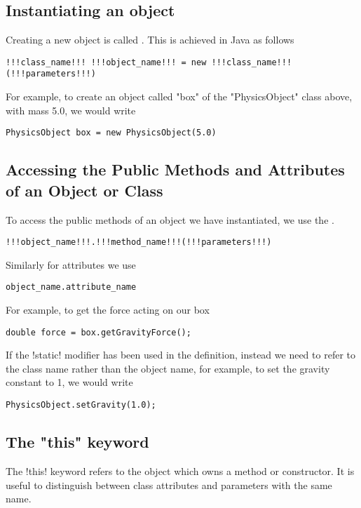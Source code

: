 \documentclass[11pt]{article}
\begin{document}
\subsection{Instantiating an object}
Creating a new object is called . This is achieved in Java as follows
\vspace{-30pt}
\begin{lstlisting}[style=javaSyntax]
!!!class_name!!! !!!object_name!!! = new !!!class_name!!!(!!!parameters!!!)
\end{lstlisting}
For example, to create an object called \inlineJava"box" of the \inlineJava"PhysicsObject" class above, with mass 5.0, we would write
\vspace{-15pt}
\begin{lstlisting}
PhysicsObject box = new PhysicsObject(5.0)
\end{lstlisting}

\subsection{Accessing the Public Methods and Attributes of an Object or Class}
To access the public methods of an object we have instantiated, we use the .
\vspace{-22pt}
\begin{lstlisting}[style=javaSyntax]
!!!object_name!!!.!!!method_name!!!(!!!parameters!!!)
\end{lstlisting}
Similarly for attributes we use
\vspace{-22pt}
\begin{lstlisting}[style=javaSyntax]
object_name.attribute_name
\end{lstlisting}
For example, to get the force acting on our box
\vspace{-15pt}
\begin{lstlisting}
double force = box.getGravityForce();
\end{lstlisting}
If the \inlineJava!static! modifier has been used in the definition, instead we need to refer to the class name rather than the object name, for example, to set the gravity constant to 1, we would write
\vspace{-15pt}
\begin{lstlisting}
PhysicsObject.setGravity(1.0);
\end{lstlisting}
\subsection{The "this" keyword}
The  \inlineJava!this! keyword refers to the object which owns a method or constructor. It is useful to distinguish between class attributes and parameters with the same name. 
\end{document}
